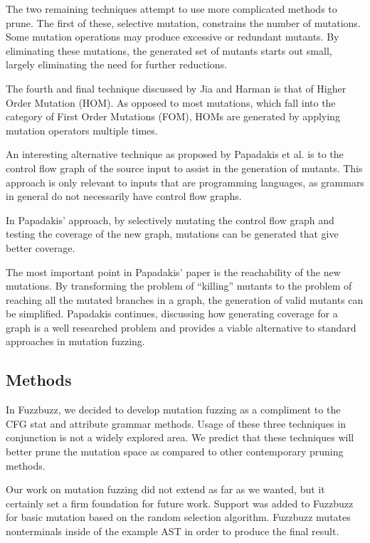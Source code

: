 The two remaining techniques attempt to use more complicated methods
to prune. The first of these, selective mutation, constrains the number
of mutations. Some mutation operations may produce excessive or
redundant mutants. By eliminating these mutations, the generated set
of mutants starts out small, largely eliminating the need for further
reductions.

The fourth and final technique discussed  by Jia and Harman is that of
Higher Order Mutation (HOM). As opposed to most mutations, which fall
into the category of First Order Mutations (FOM), HOMs are generated
by applying mutation operators multiple times.

An interesting alternative technique as proposed by Papadakis et
al. is to the control flow graph of the source input to assist in the
generation of mutants. \cite{Papadakis2010} This approach is only
relevant to inputs that are programming languages, as grammars in
general do not necessarily have control flow graphs.

In Papadakis' approach, by selectively mutating the control flow graph
and testing the coverage of the new graph, mutations can be generated
that give better coverage.

The most important point in Papadakis' paper is the reachability of
the new mutations. By transforming the problem of ``killing'' mutants
to the problem of reaching all the mutated branches in a graph, the
generation of valid mutants can be simplified. Papadakis continues,
discussing how generating coverage for a graph is a well researched
problem and provides a viable alternative to standard approaches in
mutation fuzzing.





\subsection{Methods}

In Fuzzbuzz, we decided to develop mutation fuzzing as a compliment to
the CFG stat and attribute grammar methods. Usage of these three
techniques in conjunction is not a widely explored area. We predict
that these techniques will better prune the mutation space as compared
to other contemporary pruning methods.

Our work on mutation fuzzing did not extend as far as we wanted, but
it certainly set a firm foundation for future work. Support was added
to Fuzzbuzz for basic mutation based on the random selection
algorithm. Fuzzbuzz mutates nonterminals inside of the example AST in
order to produce the final result.

